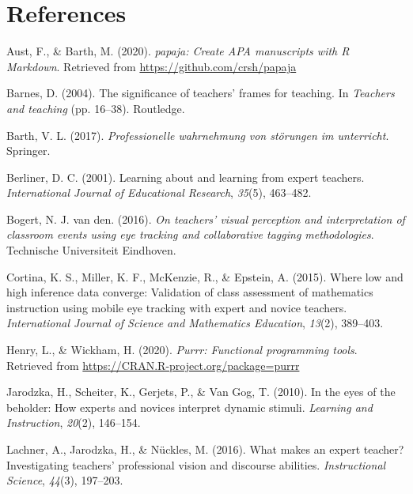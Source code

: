 \documentclass[
  english,
  man,floatsintext]{apa6}
\begin{document}
\newpage

\hypertarget{references}{%
\section{References}\label{references}}

\begingroup
\setlength{\parindent}{-0.5in}
\setlength{\leftskip}{0.5in}

\hypertarget{refs}{}
\leavevmode\hypertarget{ref-R-papaja}{}%
Aust, F., \& Barth, M. (2020). \emph{papaja: Create APA manuscripts with R Markdown}. Retrieved from \url{https://github.com/crsh/papaja}

\leavevmode\hypertarget{ref-barnes2004significance}{}%
Barnes, D. (2004). The significance of teachers' frames for teaching. In \emph{Teachers and teaching} (pp. 16--38). Routledge.

\leavevmode\hypertarget{ref-barth2017professionelle}{}%
Barth, V. L. (2017). \emph{Professionelle wahrnehmung von störungen im unterricht}. Springer.

\leavevmode\hypertarget{ref-berliner2001learning}{}%
Berliner, D. C. (2001). Learning about and learning from expert teachers. \emph{International Journal of Educational Research}, \emph{35}(5), 463--482.

\leavevmode\hypertarget{ref-bogert2016visualperception}{}%
Bogert, N. J. van den. (2016). \emph{On teachers' visual perception and interpretation of classroom events using eye tracking and collaborative tagging methodologies}. Technische Universiteit Eindhoven.

\leavevmode\hypertarget{ref-cortina2015low}{}%
Cortina, K. S., Miller, K. F., McKenzie, R., \& Epstein, A. (2015). Where low and high inference data converge: Validation of class assessment of mathematics instruction using mobile eye tracking with expert and novice teachers. \emph{International Journal of Science and Mathematics Education}, \emph{13}(2), 389--403.

\leavevmode\hypertarget{ref-R-purrr}{}%
Henry, L., \& Wickham, H. (2020). \emph{Purrr: Functional programming tools}. Retrieved from \url{https://CRAN.R-project.org/package=purrr}

\leavevmode\hypertarget{ref-jarodzka2010eyes}{}%
Jarodzka, H., Scheiter, K., Gerjets, P., \& Van Gog, T. (2010). In the eyes of the beholder: How experts and novices interpret dynamic stimuli. \emph{Learning and Instruction}, \emph{20}(2), 146--154.

\leavevmode\hypertarget{ref-lachner2016makes}{}%
Lachner, A., Jarodzka, H., \& Nückles, M. (2016). What makes an expert teacher? Investigating teachers' professional vision and discourse abilities. \emph{Instructional Science}, \emph{44}(3), 197--203.
\end{document}
